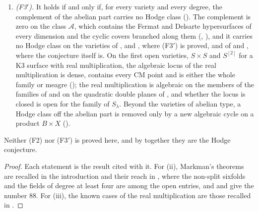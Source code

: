 \begin{theorem}
\begin{enumerate}[label=\textup{(\roman*)},leftmargin=2.6em,itemsep=3pt]
  () and on every member once one Kuga--Satake class is
  algebraic (), or once one complex at one CM point has
  $\Ext^{2}$ of dimension $119$ ().
\item \emph{(F3$'$).} It holds if and only if, for every variety and every
  degree, the complement of the abelian part carries no Hodge class
  (). The complement is zero on the class $\mathcal{A}$,
  which contains the Fermat and Delsarte hypersurfaces of every dimension and
  the cyclic covers branched along them (,
  ), and it carries no Hodge class on the varieties of
  ,  and
  , where \textup{(F3$'$)} is proved, and of
   and , where the conjecture itself
  is.
  On the first open varieties, $S\times S$ and $S^{[2]}$ for a K3 surface
  with real multiplication, the algebraic locus of the real multiplication
  is dense, contains every CM point and is either the whole family or meagre
  (); the real multiplication is algebraic on the members
  of the families of \cite{vGS25} and on the quadratic double planes of
  \cite{Sch10}, and whether the locus is closed is open for the family of
  $S_{\lambda}$. Beyond the varieties of abelian type, a Hodge
  class off the abelian part is removed only by a new algebraic cycle on a
  product $B\times X$ ().
\end{enumerate}
Neither (F2) nor \textup{(F3$'$)} is proved here, and by 
together they are the Hodge conjecture.
\end{theorem}

\begin{proof}
Each statement is the result cited with it. For (ii), Markman's theorems are
recalled in the introduction and their reach in , where the
non-split sixfolds and the fields of degree at least four are among the open
entries, and  and
 give the number $88$. For (iii), the known cases of
the real multiplication are those recalled in .
\end{proof}
